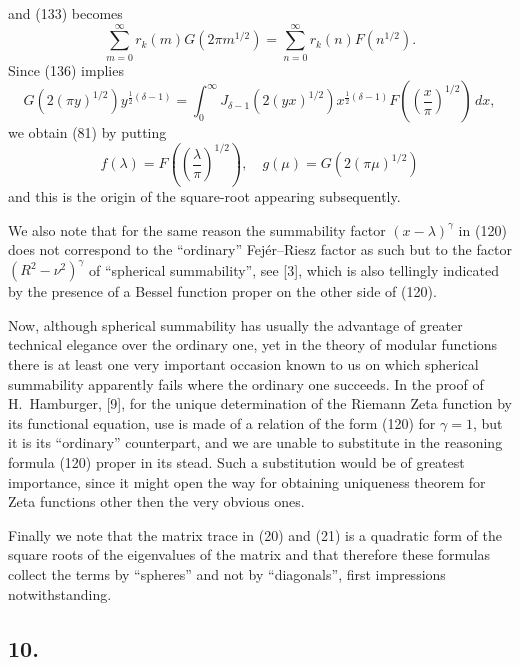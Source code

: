 \documentclass[12pt]{article}
\begin{document}
and (133) becomes
\begin{equation}
\sum_{m=0}^{\infty} r_k(m) G(2\pi m^{1/2}) = \sum_{n=0}^{\infty} r_k(n) F(n^{1/2}).
\tag{137}
\end{equation}
Since (136) implies
\begin{equation}
G(2(\pi y)^{1/2}) y^{\frac{1}{2}(\delta-1)} = \int_0^{\infty} J_{\delta-1}(2(yx)^{1/2}) x^{\frac{1}{2}(\delta-1)} F \left( \left( \frac{x}{\pi} \right)^{1/2} \right) \, dx,
\tag{138}
\end{equation}
we obtain (81) by putting
\[
f(\lambda) = F \left( \left( \frac{\lambda}{\pi} \right)^{1/2} \right), \quad g(\mu) = G(2(\pi \mu)^{1/2})
\]
and this is the origin of the square-root appearing subsequently.

We also note that for the same reason the summability factor \((x - \lambda)^\gamma\) in (120) does not correspond to the ``ordinary'' Fejér–Riesz factor as such but to the factor \((R^2 - \nu^2)^\gamma\) of ``spherical summability'', see [3], which is also tellingly indicated by the presence of a Bessel function proper on the other side of (120).

Now, although spherical summability has usually the advantage of greater technical elegance over the ordinary one, yet in the theory of modular functions there is at least one very important occasion known to us on which spherical summability apparently fails where the ordinary one succeeds. In the proof of H.~Hamburger, [9], for the unique determination of the Riemann Zeta function by its functional equation, use is made of a relation of the form (120) for \(\gamma = 1\), but it is its ``ordinary'' counterpart, and we are unable to substitute in the reasoning formula (120) proper in its stead. Such a substitution would be of greatest importance, since it might open the way for obtaining uniqueness theorem for Zeta functions other then the very obvious ones.

Finally we note that the matrix trace in (20) and (21) is a quadratic form of the square roots of the eigenvalues of the matrix and that therefore these formulas collect the terms by ``spheres'' and not by ``diagonals'', first impressions notwithstanding.

\subsection*{10.}
\end{document}

